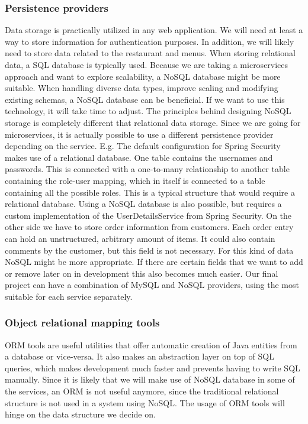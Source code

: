 \documentclass[12pt]{article}
\begin{document}
\begin{multicols}{2}
\subsubsection{Persistence providers}
Data storage is practically utilized in any web application. We will need at least a way to store information for authentication purposes. In addition, we will likely need to store data related to the restaurant and menus. When storing relational data, a SQL database is typically used. Because we are taking a microservices approach and want to explore scalability, a NoSQL database might be more suitable.\cite{MongodbVsMySQL92:online} When handling diverse data types, improve scaling and modifying existing schemas, a NoSQL database can be beneficial. If we want to use this technology, it will take time to adjust. The principles behind designing NoSQL storage is completely different that relational data storage.
Since we are going for microservices, it is actually possible to use a different persistence provider depending on the service.
E.g. The default configuration for Spring Security makes use of a relational database. One table contains the usernames and passwords. This is connected with a one-to-many relationship to another table containing the role-user mapping, which in itself is connected to a table containing all the possible roles. This is a typical structure that would require a relational database. Using a NoSQL database is also possible, but requires a custom implementation of the UserDetailsService from Spring Security. On the other side we have to store order information from customers. Each order entry can hold an unstructured, arbitrary amount of items. It could also contain comments by the customer, but this field is not necessary. For this kind of data NoSQL might be more appropriate. If there are certain fields that we want to add or remove later on in development this also becomes much easier. Our final project can have a combination of MySQL and NoSQL providers, using the most suitable for each service separately.
\subsubsection{Object relational mapping tools}
ORM tools are useful utilities that offer automatic creation of Java entities from a database or vice-versa. It also makes an abstraction layer on top of SQL queries, which makes development much faster and prevents having to write SQL manually. Since it is likely that we will make use of NoSQL database in some of the services, an ORM is not useful anymore, since the traditional relational structure is not used in a system using NoSQL. The usage of ORM tools will hinge on the data structure we decide on.

\end{multicols}
\end{document}
